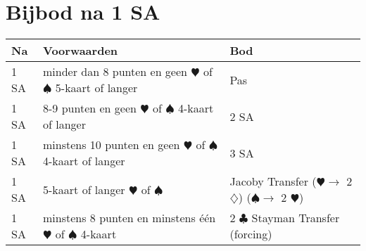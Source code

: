 \documentclass[12pt,a4paper]{report}
\begin{document}
\section{Bijbod na 1 SA}
\begin{tabular}{|l|p{}|p{}|}
	\hline 
	\textbf{Na} &\textbf{Voorwaarden}  &\textbf{Bod}  \\ 
	\hline
	
	1 SA
    & minder dan 8 punten\newline
      en geen $\varheartsuit$ of $\spadesuit$ 5-kaart of langer
    & Pas \\
    \hline
    
    1 SA
    & 8-9 punten\newline
    en geen $\varheartsuit$ of $\spadesuit$ 4-kaart of langer
    & 2 SA \\
    \hline
    
    1 SA
    & minstens 10 punten\newline
    en geen $\varheartsuit$ of $\spadesuit$ 4-kaart of langer
    & 3 SA \\
    \hline
    
    1 SA
    &  5-kaart of langer $\varheartsuit$ of $\spadesuit$
    &  Jacoby Transfer\newline
       ($\varheartsuit \rightarrow$ 2 $\diamondsuit$) \newline
       ($\spadesuit \rightarrow$ 2 $\varheartsuit$)\\
    \hline
    
    1 SA
    & minstens 8 punten\newline
      en minstens \'e\'en $\varheartsuit$ of $\spadesuit$ 4-kaart
    & 2 $\clubsuit$ Stayman Transfer (forcing)\\
    \hline
\end{tabular}

\ \\ \ \\
\end{document}

